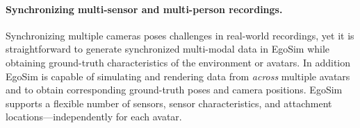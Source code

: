 \paragraph{Synchronizing multi-sensor and multi-person recordings.}
Synchronizing multiple cameras poses challenges in real-world recordings, yet it is straightforward to generate synchronized multi-modal data in EgoSim while obtaining ground-truth characteristics of the environment or avatars.
In addition EgoSim is capable of simulating and rendering data from \emph{across} multiple avatars and to obtain corresponding ground-truth poses and camera positions.
EgoSim supports a flexible number of sensors, sensor characteristics, and attachment locations---independently for each avatar. 
